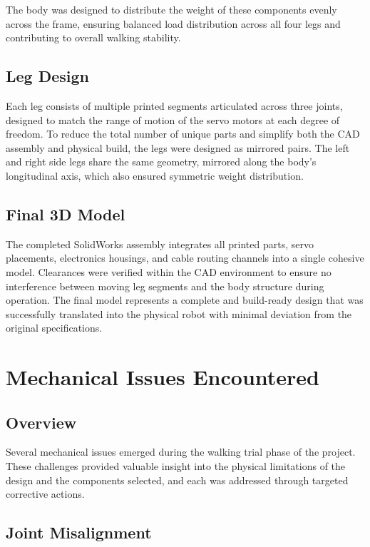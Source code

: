 \documentclass{article}
\begin{document}
The body was designed to distribute the weight of these components evenly across the frame, ensuring balanced load distribution across all four legs and contributing to overall walking stability.

\subsection*{Leg Design}

Each leg consists of multiple printed segments articulated across three joints, designed to match the range of motion of the servo motors at each degree of freedom. To reduce the total number of unique parts and simplify both the CAD assembly and physical build, the legs were designed as mirrored pairs. The left and right side legs share the same geometry, mirrored along the body's longitudinal axis, which also ensured symmetric weight distribution.

\subsection*{Final 3D Model}

The completed SolidWorks assembly integrates all printed parts, servo placements, electronics housings, and cable routing channels into a single cohesive model. Clearances were verified within the CAD environment to ensure no interference between moving leg segments and the body structure during operation. The final model represents a complete and build-ready design that was successfully translated into the physical robot with minimal deviation from the original specifications.
\section{Mechanical Issues Encountered}

\subsection*{Overview}

Several mechanical issues emerged during the walking trial phase of the project. These challenges provided valuable insight into the physical limitations of the design and the components selected, and each was addressed through targeted corrective actions.

\subsection*{Joint Misalignment}
\end{document}
